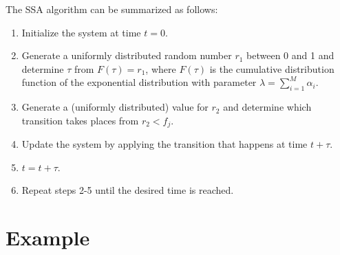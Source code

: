\documentclass[12pt]{article}
\begin{document}
The SSA algorithm can be summarized as follows:
\begin{enumerate}
\item Initialize the system at time $t=0$.
\item Generate a uniformly distributed random number $r_1$ between 0 and 1 and determine $\tau$ from $F(\tau)=r_1$, where $F(\tau)$ is the cumulative distribution function of the exponential distribution with parameter $\lambda=\sum_{i=1}^{M}\alpha_i$.
\item Generate a (uniformly distributed) value for $r_2$ and determine which transition takes places from $r_2<f_j$.
\item Update the system by applying the transition that happens at time $t+\tau$.
\item $t=t+\tau$.
\item Repeat steps 2-5 until the desired time is reached.
\end{enumerate}

\section{Example}
\end{document}
